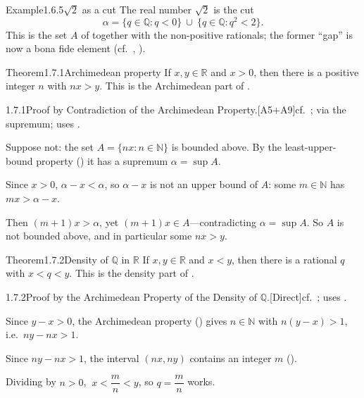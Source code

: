 \documentclass[main.tex]{subfiles}
\begin{document}
\begin{ObjL}{Example}{1.6.5}{$\sqrt2$ as a cut}
The real number $\sqrt2$ is the cut
\[ \alpha=\{q\in\mathbb Q : q<0\}\ \cup\ \{q\in\mathbb Q : q^2<2\} . \]
This is the set $A$ of  together with the non-positive rationals; the former ``gap''
is now a bona fide element (cf.\ , ).
\end{ObjL}


\begin{Obj}{Theorem}{1.7.1}{Archimedean property}
If $x,y\in\mathbb R$ and $x>0$, then there is a positive integer $n$ with $nx>y$.
This is the Archimedean part of .
\end{Obj}
\begin{Prf}{1.7.1}{Proof by Contradiction of the Archimedean Property.}{[A5$+$A9]\quad cf.\ ; via the supremum; uses .}
\item Suppose not: the set $A=\{nx : n\in\mathbb N\}$ is bounded above. By the least-upper-bound
  property () it has a supremum $\alpha=\sup A$.
\item Since $x>0$, $\alpha-x<\alpha$, so $\alpha-x$ is not an upper bound of $A$: some
  $m\in\mathbb N$ has $mx>\alpha-x$.
\item Then $(m+1)x>\alpha$, yet $(m+1)x\in A$---contradicting $\alpha=\sup A$. So $A$ is not
  bounded above, and in particular some $nx>y$.
\end{Prf}

\begin{Obj}{Theorem}{1.7.2}{Density of $\mathbb Q$ in $\mathbb R$}
If $x,y\in\mathbb R$ and $x<y$, then there is a rational $q$ with $x<q<y$.
This is the density part of .
\end{Obj}
\begin{Prf}{1.7.2}{Proof by the Archimedean Property of the Density of $\mathbb Q$.}{[Direct]\quad cf.\ ; uses .}
\item Since $y-x>0$, the Archimedean property () gives $n\in\mathbb N$ with
  $n(y-x)>1$, i.e.\ $ny-nx>1$.
\item Since $ny-nx>1$, the interval $(nx,ny)$ contains an integer $m$ ().
\item Dividing by $n>0$, $\ x<\dfrac mn<y$, so $q=\dfrac mn$ works.
\end{Prf}
\end{document}
